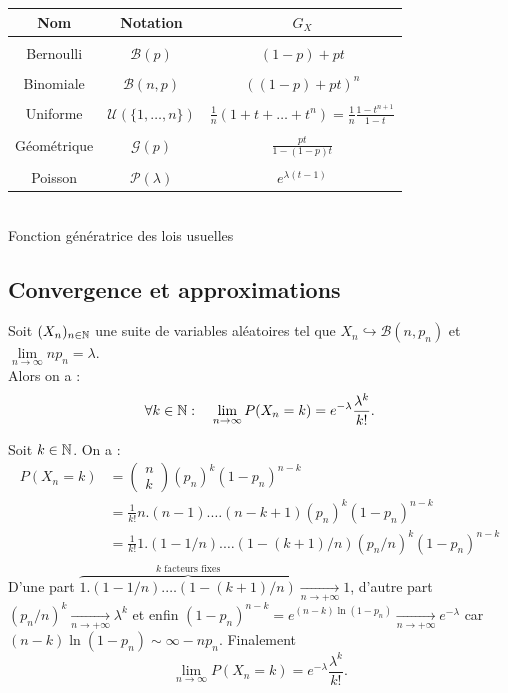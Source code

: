 \documentclass{book}
\begin{document}
\begin{center}

\begin{tabular}{ccc}
Nom&Notation & $G_X$\\\hline 
&& \\
Bernoulli & $\mathcal{B}(p)$& $(1-p)+pt$\\\hline
&& \\
Binomiale & $\mathcal{B}(n,p)$& $\left((1-p)+pt\right)^n$\\\hline
&& \\
Uniforme &$\mathcal{U}( \{1,\dots , n\})$& $\frac{1}{n}(1+t+\dots+t^{n})=\frac{1}{n}\frac{1-t^{n+1}}{1-t}$\\\hline
&& \\
Géométrique &$\mathcal{G}( p)$& $\frac{pt}{1-(1-p)t}$\\\hline
&& \\
Poisson &$\mathcal{P}(\lambda)$& $e^{\lambda(t-1)}$\\\hline

\end{tabular}\\
Fonction génératrice des lois usuelles
\end{center}


\subsection{Convergence et approximations}

\begin{Proposition}
Soit $(X_n)_{n\in\mathbb{N}}$ une suite de variables aléatoires tel que $X_n\hookrightarrow \mathcal{B}(n,p_n)$ et $\lim\limits_{n\to\infty}np_n=\lambda$.\\
Alors on a :
$$\forall k \in \mathbb{N}:\quad  \lim\limits_{n\to\infty} P(X_n = k) = e^{-\lambda}\frac{\lambda^k}{k!}.$$
\end{Proposition}
\begin{Demonstration}
Soit $k\in \mathbb{N}$. On a :
$$\begin{aligned}
P(X_n = k) &= \begin{pmatrix}n \\ k \end{pmatrix} (p_n)^k (1-p_n)^{n-k}\\
&= \frac{1}{k!} n.(n-1).\dots (n-k+1)(p_n)^k (1-p_n)^{n-k} \\
&= \frac{1}{k!} 1.(1-1/n).\dots (1-(k+1)/n)(p_n/n)^k (1-p_n)^{n-k} \\
\end{aligned}$$
D'une part  $\overbrace{1.(1-1/n).\dots (1-(k+1)/n)}^{k \text{ facteurs fixes}}\xrightarrow[n\to+\infty]{}1$, d'autre part $(p_n/n)^k\xrightarrow[n\to+\infty]{} \lambda^k$ et enfin $(1-p_n)^{n-k}=e^{(n-k)\ln(1-p_n)}\xrightarrow[n\to+\infty]{} e^{-\lambda}$ car $(n-k)\ln(1-p_n)\sim{\infty} -np_n$. Finalement
$$\lim\limits_{n\to\infty} P(X_n = k) = e^{-\lambda}\frac{\lambda^k}{k!}.$$
\end{Demonstration}
\end{document}
